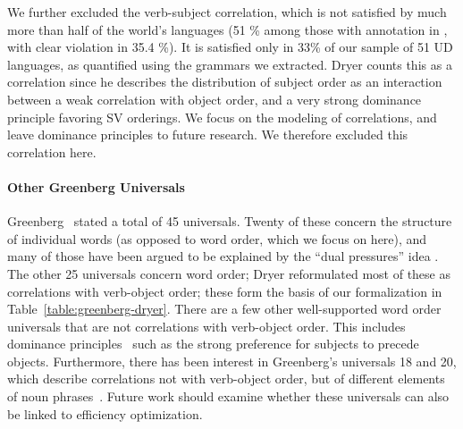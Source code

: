 \documentclass[10pt,twoside,lineno]{article}
\begin{document}
We further excluded the verb-subject correlation, which is not satisfied by much more than half of the world's languages (51 \% among those with annotation in \cite{wals-81}, with clear violation in 35.4 \%).
It is satisfied only in 33\% of our sample of 51 UD languages, as quantified using the grammars we extracted.
Dryer \cite{dryer1992greenbergian} counts this as a correlation since he describes the distribution of subject order as an interaction between a weak correlation with object order, and a very strong dominance principle favoring SV orderings.
We focus on the modeling of correlations, and leave dominance principles to future research.
We therefore excluded this correlation here.





\paragraph{Other Greenberg Universals}
Greenberg~\cite{greenberg1963universals} stated a total of 45 universals.
Twenty of these concern the structure of individual words (as opposed to word order, which we focus on here), and many of those have been argued to be explained by the ``dual pressures'' idea \cite{haspelmath2006against}.
The other 25 universals concern word order; Dryer \cite{dryer1992greenbergian} reformulated most of these as correlations with verb-object order; these form the basis of our formalization in Table~\ref{table:greenberg-dryer}. %
There are a few other well-supported word order universals that are not correlations with verb-object order.
This includes dominance principles~\cite{croft2003typology} such as the strong preference for subjects to precede objects.
Furthermore, there has been interest in Greenberg's universals 18 and 20, which describe correlations not with verb-object order, but of different elements of noun phrases~\cite{cinque2005deriving, culbertson2014language, dryer2018order}.
Future work should examine whether these universals can also be linked to efficiency optimization.
\end{document}
